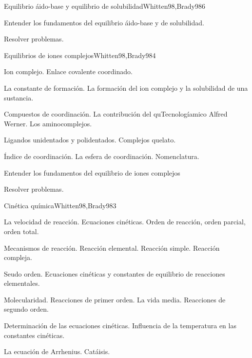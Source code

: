\begin{syllabus}
\begin{unit}{Equilibrio áido-base y equilibrio de solubilidad}{Whitten98,Brady98}{6}
\begin{unitgoals}
	\item Entender los fundamentos del equilibrio áido-base y de solubilidad.
	\item Resolver problemas.
\end{unitgoals}
\end{unit}

\begin{unit}{Equilibrios de iones complejos}{Whitten98,Brady98}{4}
\begin{topics}
	\item Ion complejo. Enlace covalente coordinado.
	\item La constante de formación. La formación del ion complejo y la solubilidad de una sustancia.
	\item Compuestos de coordinación. La contribución del quTecnologíamico Alfred Werner. Los aminocomplejos.
	\item Ligandos unidentados y polidentados. Complejos quelato.
	\item Índice de coordinación. La esfera de coordinación. Nomenclatura.
   \end{topics}

   \begin{unitgoals}
      \item Entender los fundamentos del equilibrio de iones complejos
      \item Resolver problemas.
   \end{unitgoals}
\end{unit}

\begin{unit}{Cinética química}{Whitten98,Brady98}{3}
\begin{topics}
      \item La velocidad de  reacción. Ecuaciones cinéticas. Orden de reacción, orden parcial, orden total.
      \item Mecanismos de reacción. Reacción elemental. Reacción simple. Reacción compleja.
	\item Seudo orden. Ecuaciones cinéticas y constantes de equilibrio de reacciones elementales.
	\item Molecularidad. Reacciones de primer orden. La vida media. Reacciones de segundo orden.
	\item Determinación de las ecuaciones cinéticas. Influencia de la temperatura en las constantes cinéticas.
	\item La ecuación de Arrhenius. Catáisis.
  \end{topics}


\end{unit}
\end{syllabus}
